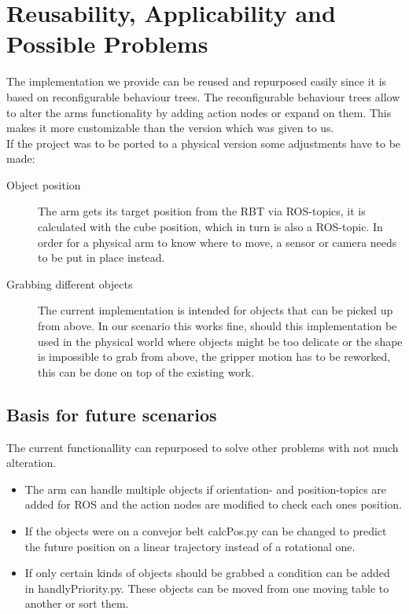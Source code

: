 \documentclass[report]{iisthesis}
\begin{document}
\chapter{Reusability, Applicability and Possible Problems}
The implementation we provide can be reused and repurposed easily since it is based on reconfigurable behaviour trees. The reconfigurable behaviour trees allow to alter the arms functionality
by adding action nodes or expand on them. This makes it more customizable than the version which was given to us. \\
If the project was to be ported to a physical version some adjustments have to be made:
\begin{description}
    \item[Object position] The arm gets its target position from the RBT via ROS-topics, it is calculated with the cube position, which in turn is also a ROS-topic. In order for a physical arm to know where to move, a sensor or camera needs to be put in place instead. 
    \item[Grabbing different objects] The current implementation is intended for objects that can be picked up from above. In our scenario this works fine, should this implementation be used in the physical world where objects might be too delicate or the shape is impossible
    to grab from above, the gripper motion has to be reworked, this can be done on top of the existing work.
\end{description} 
\noindent
\section{Basis for future scenarios}
The current functionallity can repurposed to solve other problems with not much alteration.
\begin{itemize}
    \item The arm can handle multiple objects if orientation- and position-topics are added for ROS and the action nodes are modified to check each ones position. 
    \item If the objects were on a convejor belt calcPos.py can be changed to predict the future position on a linear trajectory instead of a rotational one.
    \item If only certain kinds of objects should be grabbed a condition can be added in handlyPriority.py. These objects can be moved from one moving table to another or sort them.
\end{itemize}



\end{document}

